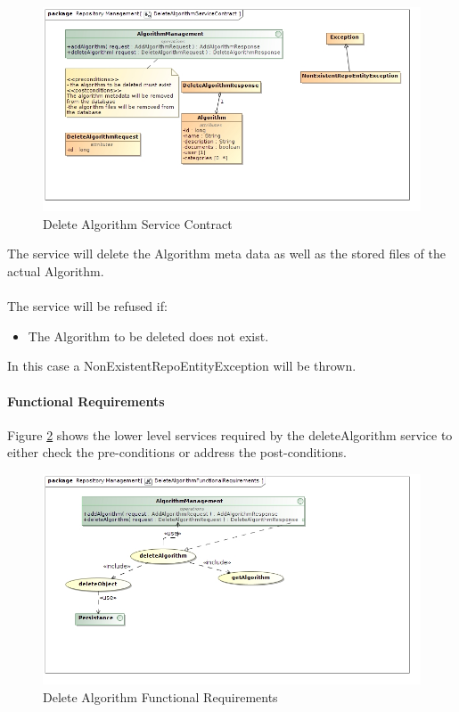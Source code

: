 \begin{figure}[H]
  \begin{center}
  \includegraphics[scale=0.5]{../Diagrams and Charts/Test Data/DeleteAlgorithmServiceContract.jpg}
  \caption{Delete Algorithm Service Contract}
  \label{fig:deleteAlgorithmService}
  \end{center}  
 \end{figure}

 The service will delete the Algorithm meta data as well as the stored files
 of the actual Algorithm.\\\\
 The service will be refused if:\\
	 \begin{itemize}
	 	\item The Algorithm to be deleted does not exist.
	 \end{itemize}
In this case a NonExistentRepoEntityException will be thrown.

\paragraph{Functional Requirements}
Figure \ref{fig:deleteAlgorithmFuncReq} shows the lower level services required
by the deleteAlgorithm service to either check the pre-conditions or address the
post-conditions.

\begin{figure}[H]
  \begin{center}
  \includegraphics[scale=0.5]{../Diagrams and Charts/Test Data/DeleteAlgorithmFunctionalRequirements.jpg}
  \caption{Delete Algorithm Functional Requirements}
  \label{fig:deleteAlgorithmFuncReq}
  \end{center}  
 \end{figure}

